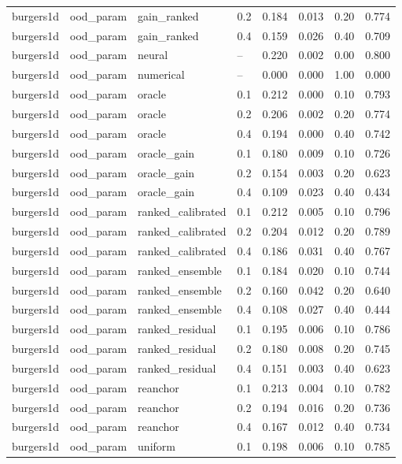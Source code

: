 \begin{tabular}{llllrrrr}
burgers1d & ood\_param & gain\_ranked & 0.2 & 0.184 & 0.013 & 0.20 & 0.774 \\
burgers1d & ood\_param & gain\_ranked & 0.4 & 0.159 & 0.026 & 0.40 & 0.709 \\
burgers1d & ood\_param & neural & -- & 0.220 & 0.002 & 0.00 & 0.800 \\
burgers1d & ood\_param & numerical & -- & 0.000 & 0.000 & 1.00 & 0.000 \\
burgers1d & ood\_param & oracle & 0.1 & 0.212 & 0.000 & 0.10 & 0.793 \\
burgers1d & ood\_param & oracle & 0.2 & 0.206 & 0.002 & 0.20 & 0.774 \\
burgers1d & ood\_param & oracle & 0.4 & 0.194 & 0.000 & 0.40 & 0.742 \\
burgers1d & ood\_param & oracle\_gain & 0.1 & 0.180 & 0.009 & 0.10 & 0.726 \\
burgers1d & ood\_param & oracle\_gain & 0.2 & 0.154 & 0.003 & 0.20 & 0.623 \\
burgers1d & ood\_param & oracle\_gain & 0.4 & 0.109 & 0.023 & 0.40 & 0.434 \\
burgers1d & ood\_param & ranked\_calibrated & 0.1 & 0.212 & 0.005 & 0.10 & 0.796 \\
burgers1d & ood\_param & ranked\_calibrated & 0.2 & 0.204 & 0.012 & 0.20 & 0.789 \\
burgers1d & ood\_param & ranked\_calibrated & 0.4 & 0.186 & 0.031 & 0.40 & 0.767 \\
burgers1d & ood\_param & ranked\_ensemble & 0.1 & 0.184 & 0.020 & 0.10 & 0.744 \\
burgers1d & ood\_param & ranked\_ensemble & 0.2 & 0.160 & 0.042 & 0.20 & 0.640 \\
burgers1d & ood\_param & ranked\_ensemble & 0.4 & 0.108 & 0.027 & 0.40 & 0.444 \\
burgers1d & ood\_param & ranked\_residual & 0.1 & 0.195 & 0.006 & 0.10 & 0.786 \\
burgers1d & ood\_param & ranked\_residual & 0.2 & 0.180 & 0.008 & 0.20 & 0.745 \\
burgers1d & ood\_param & ranked\_residual & 0.4 & 0.151 & 0.003 & 0.40 & 0.623 \\
burgers1d & ood\_param & reanchor & 0.1 & 0.213 & 0.004 & 0.10 & 0.782 \\
burgers1d & ood\_param & reanchor & 0.2 & 0.194 & 0.016 & 0.20 & 0.736 \\
burgers1d & ood\_param & reanchor & 0.4 & 0.167 & 0.012 & 0.40 & 0.734 \\
burgers1d & ood\_param & uniform & 0.1 & 0.198 & 0.006 & 0.10 & 0.785 \\

\end{tabular}
